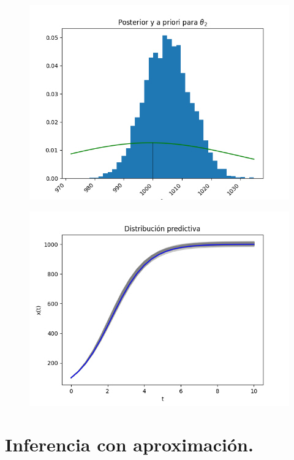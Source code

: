 \begin{figure}[H] 
    \centering 
    \includegraphics[width = 10 cm ]{img/Exp_Central_logistico_sigma/Figuras/Generales/Post_theta2_logistico_sigma.png} 
\end{figure} 


\begin{figure}[H] 
    \centering 
    \includegraphics[width = 10 cm ]{img/Exp_Central_logistico_sigma/Figuras/Generales/Predictiva_logistico_sigma.png} 
\end{figure} 





\section{Inferencia con aproximación.}


